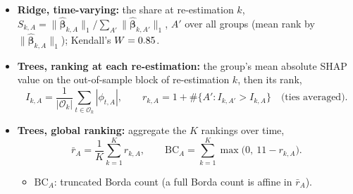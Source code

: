 \begin{itemize}
\begin{itemize}
\begin{itemize}
      standardized coefficients,
      \[
        S^{\mathrm{sd}}_A = \frac{\sum_{k} \sum_{j \in A} |\hat\beta_{k,j}|\, \mathrm{sd}_{k,j}}
          {\sum_{k} \sum_{j=1}^{p} |\hat\beta_{k,j}|\, \mathrm{sd}_{k,j}},
      \]
      with $\mathrm{sd}_{k,j}$ the standard deviation of predictor $j$ over $\mathcal W_{t_k}$;
      Spearman rank correlation of $S^{\mathrm{sd}}_A$
      with $S_A$ across groups \rhfiRidgeSpearmanSd.
    \item Leading groups on that scale: \rhfiRidgeSdTopOne{} \rhfiRidgeSdTopOneShare\,\%, \rhfiRidgeSdTopTwo{}
      \rhfiRidgeSdTopTwoShare\,\%, \rhfiRidgeSdTopThree{} \rhfiRidgeSdTopThreeShare\,\%.
    \end{itemize}
  \item Leading groups: \rhfiRidgeTopOne{} \rhfiRidgeTopOneShare\,\%, \rhfiRidgeTopTwo{} \rhfiRidgeTopTwoShare\,\%,
    \rhfiRidgeTopThree{} \rhfiRidgeTopThreeShare\,\%; HAR benchmark block \rhfiRidgeBackboneShare\,\% (median
    re-estimation).
  \item Ridge sets no coefficient to zero: all \rhfiRidgeAllSelected{} groups have $K_A = K$, so the selection frequency
    does not discriminate.
  \item Random-probe benchmark: \rhfiRidgeProbeBeat{} predictors, in \rhfiRidgeProbeBeatSeries{} exogenous series, have
    $|\hat\beta_{k,j}|$ above the continuous probe's (robust-scaled) in most probe fits.
  \end{itemize}
\item \textbf{Ridge, time-varying:} the share at re-estimation $k$,
  $S_{k,A} = \lVert\hat{\bm\beta}_{k,A}\rVert_1 / \sum_{A'} \lVert\hat{\bm\beta}_{k,A'}\rVert_1$, $A'$ over all groups
  (mean rank by $\lVert\hat{\bm\beta}_{k,A}\rVert_1$); Kendall's
  $W = 0.85$.
\item \textbf{Trees, ranking at each re-estimation:} the group's mean absolute SHAP value on the out-of-sample block
  of re-estimation $k$, then its rank,
  \[
    I_{k,A} = \frac{1}{|\mathcal O_k|} \sum_{t \in \mathcal O_k} |\phi_{t,A}|, \qquad
    r_{k,A} = 1 + \#\{A' : I_{k,A'} > I_{k,A}\} \quad \text{(ties averaged)}.
  \]
\item \textbf{Trees, global ranking:} aggregate the $K$ rankings over time,
  \[
    \bar r_A = \frac{1}{K} \sum_{k=1}^{K} r_{k,A}, \qquad
    \mathrm{BC}_A = \sum_{k=1}^{K} \max\bigl(0,\ 11 - r_{k,A}\bigr).
  \]
  \begin{itemize}
  \item $\mathrm{BC}_A$: truncated Borda count (a full Borda count is affine in $\bar r_A$).

\end{itemize}
\end{itemize}
